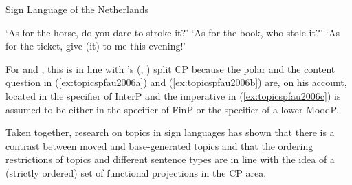 \begin{exe}
\ex Sign Language of the Netherlands\label{topicspfau2006}
\begin{xlist} 
\ex {} 
\glt `As for the horse, do you dare to stroke it?' \label{ex:topicspfau2006a} 
\ex {} 
%
\glt `As for the book, who stole it?' \label{ex:topicspfau2006b} 
\ex {} 
%
\glt `As for the ticket, give (it) to me this evening!' \label{ex:topicspfau2006c} 
\end{xlist}
\end{exe} 

\noindent For \citet{pfau2008topics} and \citet{aboh2010sa}, this is in line with \citeauthor{rizzi1997fine}'s (\citeyear{rizzi1997fine}, \citeyear{rizzi2001position}) split CP because the polar and the content question in (\ref{ex:topicspfau2006a}) and (\ref{ex:topicspfau2006b}) are, on his account, located in the specifier of InterP and the imperative in (\ref{ex:topicspfau2006c}) is assumed to be either in the specifier of FinP or the specifier of a lower MoodP.

Taken together, research on topics in sign languages has shown that there is a contrast between moved and base-generated topics and that the ordering restrictions of topics and different sentence types are in line with the idea of a (strictly ordered) set of functional projections in the CP area. 

